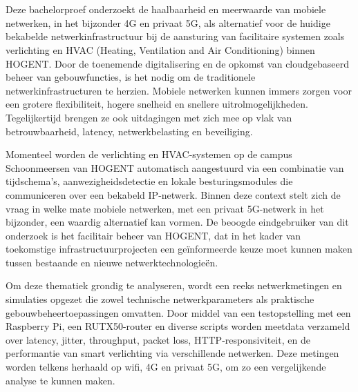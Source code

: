 
\chapter{}%
\label{ch:inleiding}

Deze bachelorproef onderzoekt de haalbaarheid en meerwaarde van mobiele netwerken, in het bijzonder 4G en privaat 5G, als alternatief voor de huidige bekabelde netwerkinfrastructuur bij de aansturing van facilitaire systemen zoals verlichting en HVAC (Heating, Ventilation and Air Conditioning) binnen HOGENT. Door de toenemende digitalisering en de opkomst van cloudgebaseerd beheer van gebouwfuncties, is het nodig om de traditionele netwerkinfrastructuren te herzien. Mobiele netwerken kunnen immers zorgen voor een grotere flexibiliteit, hogere snelheid en snellere uitrolmogelijkheden. Tegelijkertijd brengen ze ook uitdagingen met zich mee op vlak van betrouwbaarheid, latency, netwerkbelasting en beveiliging. \newline 

Momenteel worden de verlichting en HVAC-systemen op de campus Schoonmeersen van HOGENT automatisch aangestuurd via een combinatie van tijdschema’s, aanwezigheidsdetectie en lokale besturingsmodules die communiceren over een bekabeld IP-netwerk. Binnen deze context stelt zich de vraag in welke mate mobiele netwerken, met een privaat 5G-netwerk in het bijzonder, een waardig alternatief kan vormen. De beoogde eindgebruiker van dit onderzoek is het facilitair beheer van HOGENT, dat in het kader van toekomstige infrastructuurprojecten een geïnformeerde keuze moet kunnen maken tussen bestaande en nieuwe netwerktechnologieën. \newline

Om deze thematiek grondig te analyseren, wordt een reeks netwerkmetingen en simulaties opgezet die zowel technische netwerkparameters als praktische gebouwbeheertoepassingen omvatten. Door middel van een testopstelling met een Raspberry Pi, een RUTX50-router en diverse scripts worden meetdata verzameld over latency, jitter, throughput, packet loss, HTTP-responsiviteit, en de performantie van smart verlichting via verschillende netwerken. Deze metingen worden telkens herhaald op wifi, 4G en privaat 5G, om zo een vergelijkende analyse te kunnen maken. \newline

